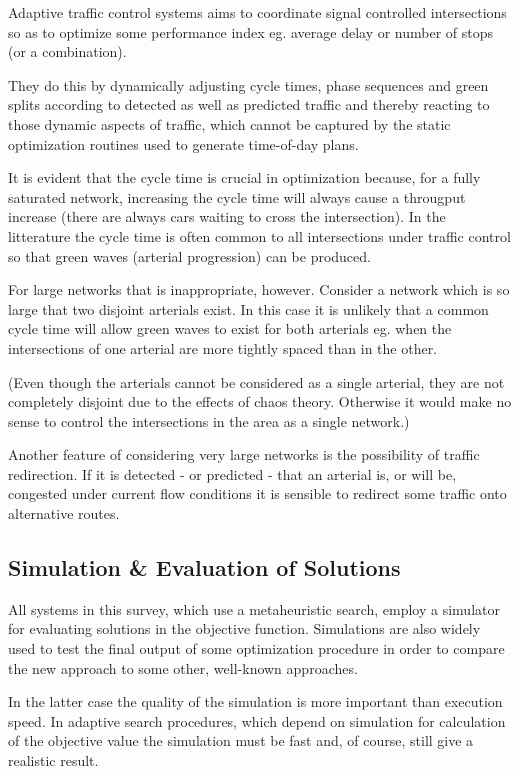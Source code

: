 \label{adaptive_cooperation}
Adaptive traffic control systems aims to coordinate signal controlled intersections so as to optimize some performance index eg. average delay or number of stops (or a combination).

They do this by dynamically adjusting cycle times, phase sequences and green splits according to detected as well as predicted traffic and thereby reacting to those dynamic aspects of traffic, which cannot be captured by the static optimization routines used to generate time-of-day plans.

It is evident that the cycle time is crucial in optimization because, for a fully saturated network, increasing the cycle time will always cause a througput increase (there are always cars waiting to cross the intersection). In the litterature the cycle time is often common to all intersections under traffic control so that green waves (arterial progression) can be produced. 

For large networks that is inappropriate, however. Consider a network which is so large that two disjoint arterials exist. In this case it is unlikely that a common cycle time will allow green waves to exist for both arterials eg. when the intersections of one arterial are more tightly spaced than in the other.

(Even though the arterials cannot be considered as a single arterial, they are not completely disjoint due to the effects of chaos theory. Otherwise it would make no sense to control the intersections in the area as  a single network.)

Another feature of considering very large networks is the possibility of traffic redirection. If it is detected - or predicted - that an arterial is, or will be, congested under current flow conditions it is sensible to redirect some traffic onto alternative routes. 

\subsection{Simulation \& Evaluation of Solutions}
All systems in this survey, which use a metaheuristic search, employ a simulator for evaluating solutions in the objective function. Simulations are also widely used to test the final output of some optimization procedure in order to compare the new approach to some other, well-known approaches. 

In the latter case the quality of the simulation is more important than execution speed. In adaptive search procedures, which depend on simulation for calculation of the objective value the simulation must be fast and, of course, still give a realistic result. 


